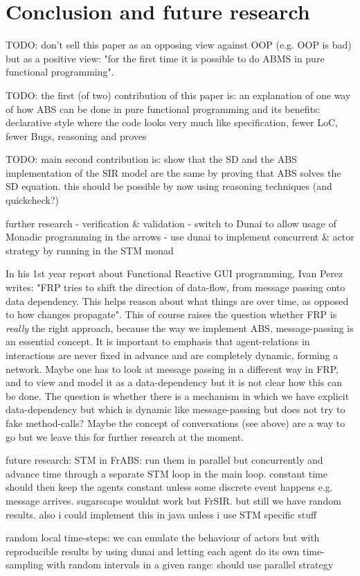 \section{Conclusion and future research}


TODO: don't sell this paper as an opposing view against OOP (e.g. OOP is bad) but as a positive view: "for the first time it is possible to do ABMS in pure functional programming".

TODO: the first (of two) contribution of this paper is: an explanation of one way of how ABS can be done in pure functional programming and its benefits: declarative style where the code looks very much like specification, fewer LoC, fewer Bugs, reasoning and proves

TODO: main second contribution is: show that the SD and the ABS implementation of the SIR model are the same by proving that ABS solves the SD equation. this should be possible by now using reasoning techniques (and quickcheck?)

further research
	- verification \& validation
	- switch to Dunai to allow usage of Monadic programming in the arrows
	- use dunai to implement concurrent \& actor strategy by running in the STM monad
	
In his 1st year report about Functional Reactive GUI programming, Ivan Perez writes: "FRP tries to shift the direction of data-flow, from message passing onto data dependency. This helps reason about what things are over time, as opposed to how changes propagate". This of course raises the question whether FRP is \textit{really} the right approach, because the way we implement ABS, message-passing is an essential concept. It is important to emphasis that agent-relations in interactions are never fixed in advance and are completely dynamic, forming a network. Maybe one has to look at message passing in a different way in FRP, and to view and model it as a data-dependency but it is not clear how this can be done. The question is whether there is a mechanism in which we have explicit data-dependency but which is dynamic like message-passing but does not try to fake method-calls? Maybe the concept of conversations (see above) are a way to go but we leave this for further research at the moment.


future research: STM in FrABS: run them in parallel but concurrently and advance time through a separate STM loop in the main loop. constant time should then keep the agents constant unless some discrete event happens e.g. message arrives. sugarscape wouldnt work but FrSIR. but still we have random results. also i could implement this in java unless i use STM specific stuff

random local time-steps: we can emulate the behaviour of actors but with reproducible results by using dunai and letting each agent do its own time-sampling with random intervals in a given range: should use parallel strategy